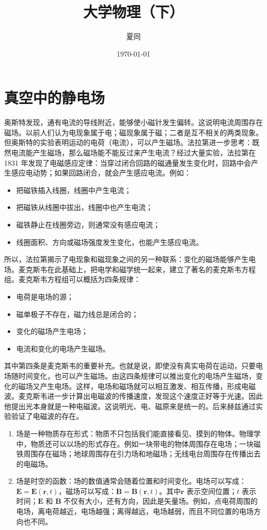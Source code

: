 \documentclass[lang=cn,11pt]{elegantbook}
\title{大学物理（下）}
\author{夏同}
\institute{华南理工大学}
\date{\today}
\begin{document}
\maketitle
\frontmatter
{}

\tableofcontents
\makeenvindex
\mainmatter

\chapter{真空中的静电场}

奥斯特发现，通有电流的导线附近，能够使小磁针发生偏转。这说明电流周围存在磁场。以前人们认为电现象属于电；磁现象属于磁；二者是互不相关的两类现象。但奥斯特的实验表明运动的电荷（电流），可以产生磁场。法拉第进一步思考：既然电流能产生磁场，那么磁场能不能反过来产生电流？经过大量实验，法拉第在 1831 年发现了电磁感应定律：当穿过闭合回路的磁通量发生变化时，回路中会产生感应电动势；如果回路闭合，就会产生感应电流。例如：
\begin{itemize}
\item 把磁铁插入线圈，线圈中产生电流；
\item 把磁铁从线圈中拔出，线圈中也产生电流；
\item 磁铁静止在线圈旁边，则通常没有感应电流；
\item 线圈面积、方向或磁场强度发生变化，也能产生感应电流。
\end{itemize}
所以，法拉第揭示了电现象和磁现象之间的另一种联系：变化的磁场能够产生电场。麦克斯韦在此基础上，把电学和磁学统一起来，建立了著名的麦克斯韦方程组。麦克斯韦方程组可以概括为四条规律：
\begin{itemize}
\item 电荷是电场的源；
\item 磁单极子不存在，磁力线总是闭合的；
\item 变化的磁场产生电场；
\item 电流和变化的电场产生磁场。
\end{itemize}
其中第四条是麦克斯韦的重要补充。也就是说，即使没有真实电荷在运动，只要电场随时间变化，也可以产生磁场。由这四条规律可以推出变化的电场产生磁场，变化的磁场又产生电场。这样，电场和磁场就可以相互激发、相互传播，形成电磁波。麦克斯韦进一步计算出电磁波的传播速度，发现这个速度正好等于光速。因此他提出光本身就是一种电磁波。这说明光、电、磁原来是统一的。后来赫兹通过实验验证了电磁波的存在。

\begin{definition}[场]
\begin{enumerate}
\item 场是一种物质存在形式：物质不只包括我们能直接看见、摸到的物体。物理学中，物质还可以以场的形式存在。例如一块带电的物体周围存在电场；一块磁铁周围存在磁场；地球周围存在引力场和地磁场；无线电台周围存在传播出去的电磁场。
\item 场是时空的函数：场的数值通常会随着位置和时间变化。电场可以写成：\(\mathbf E=\mathbf E(\mathbf r,t)\)，磁场可以写成：\(\mathbf B=\mathbf B(\mathbf r,t)\)。其中\(\mathbf r\) 表示空间位置；\(t\) 表示时间；\(\mathbf E\) 和 \(\mathbf B\) 不仅有大小，还有方向，因此是矢量场。例如，点电荷周围的电场，离电荷越近，电场越强；离得越远，电场越弱，而且不同位置的电场方向也不同。
\end{enumerate}
\end{definition}
\end{document}
